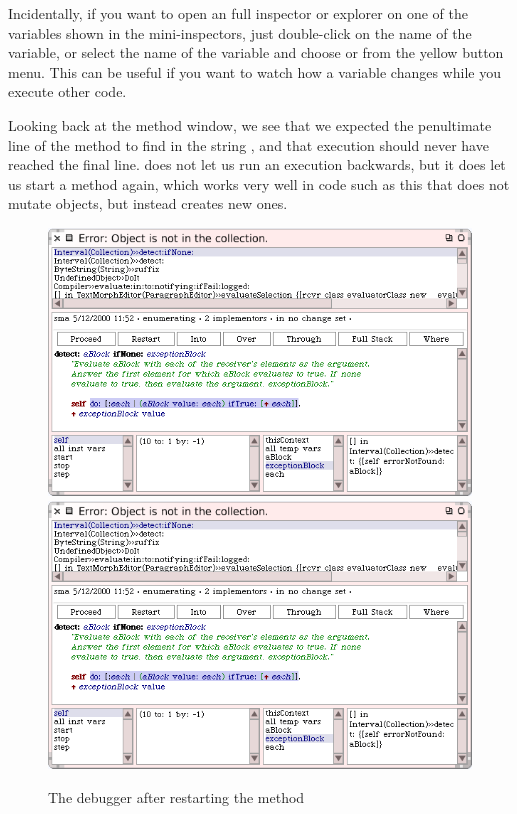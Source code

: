 \documentclass[a4paper,10pt,twoside]{book}
\begin{document}
Incidentally, if you want to open an full inspector or explorer on one of the variables shown in the mini-inspectors, just double-click on the name of the variable, or select the name of the variable and choose  or  from the yellow button menu.  
This can be useful if you want to watch how a variable changes while you execute other code. 

Looking back at the method window, we see that we expected the penultimate line of the method to find  in the string , and that execution should never have reached the final line.
\sq does not let us run an execution backwards, but it does let us start a method again, which works very well in code such as this that does not mutate objects, but instead creates new ones.  


\begin{figure}[btp]
	\begin{center}
	\ifluluelse
		{\includegraphics[width=\textwidth]{RestartDetectIfNone}}
		{\includegraphics[scale=0.7]{RestartDetectIfNone}}
	\end{center}
	\caption{The debugger after restarting the  method}
	\label{fig:RestartDetectIfNone}
\end{figure}
\end{document}
